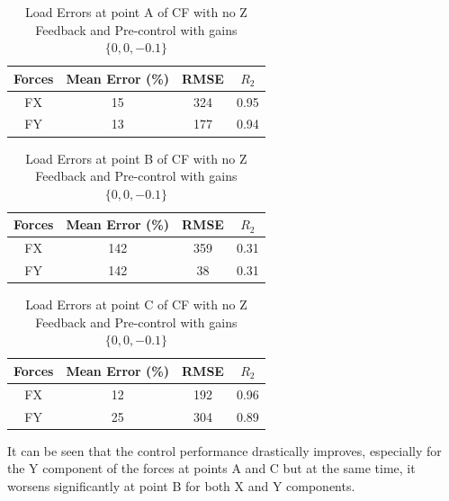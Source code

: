 \begin{table}[h!]
	\centering
	\begin{tabular}{ |c|c|c|c| } 
		\hline
		Forces & Mean Error (\%) & RMSE & $R_2$\\ 
		\hline
		FX & 15&324&0.95\\ 
		FY & 13&177&0.94 \\ 
		\hline
	\end{tabular}
	\caption{Load Errors at point A of CF with no Z Feedback and Pre-control with gains $\{0,0,-0.1\}$}
	\label{tab:noZfdkA}
\end{table}

\begin{table}[h!]
	\centering
	\begin{tabular}{ |c|c|c|c| } 
		\hline
		Forces & Mean Error (\%) & RMSE & $R_2$\\ 
		\hline
		FX & 142&359&0.31\\ 
		FY & 142&38&0.31 \\ 
		\hline
	\end{tabular}
	\caption{Load Errors at point B of CF with no Z Feedback and Pre-control with gains $\{0,0,-0.1\}$}
	\label{tab:noZfdkB}
\end{table}

\begin{table}[h!]
	\centering
	\begin{tabular}{ |c|c|c|c| } 
		\hline
		Forces & Mean Error (\%) & RMSE & $R_2$\\ 
		\hline
		FX & 12&192&0.96\\ 
		FY & 25&304&0.89 \\ 
		\hline
	\end{tabular}
	\caption{Load Errors at point C of CF with no Z Feedback and Pre-control with gains $\{0,0,-0.1\}$}
	\label{tab:noZfdkC}
\end{table}

It can be seen that the control performance drastically improves, especially for the Y component of the forces at points A and C but at the same time, it worsens significantly at point B for both X and Y components.


